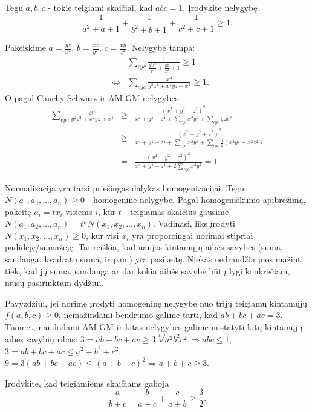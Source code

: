 \begin{pavnr}
  Tegu $a,b,c$ - tokie teigiami skaičiai, kad $abc=1$. Įrodykite nelygybę
  $$\frac{1}{a^2+a+1}+\frac{1}{b^2+b+1}+\frac{1}{c^2+c+1}\geq1.$$
\end{pavnr}

\begin{sprendimas}
  Pakeiskime $a=\frac{yz}{x^2}$, $b=\frac{xz}{y^2}$, $c=\frac{xy}{z^2}$. Nelygybė tampa:
  \begin{eqnarray*}&&\sum_{cyc}{\frac{1}{\frac{y^2z^2}{x^4}+\frac{yz}{x^2}+1}}\geq1\\
    &\Leftrightarrow&\sum_{cyc}{\frac{x^4}{y^2z^2+x^2yz+x^4}}\geq1.
  \end{eqnarray*}
  O pagal Cauchy-Schwarz ir AM-GM nelygybes:
  \begin{eqnarray*}\sum_{cyc}{\frac{x^4}{y^2z^2+x^2yz+x^4}}&\geq&\frac{(x^2+y^2+z^2)^2}{x^4+y^4+z^4+\sum\limits_{cyc}{x^2y^2}+\sum\limits_{cyc}{yzx^2}}\\
    &\geq&\frac{(x^2+y^2+z^2)^2}{x^4+y^4+z^4+\sum\limits_{cyc}{x^2y^2}+\sum\limits_{cyc}{\frac{1}{2}(x^2y^2+x^2z^2)}}\\
    &=&\frac{(x^2+y^2+z^2)^2}{x^4+y^4+z^4+2\sum\limits_{cyc}{x^2y^2}}=1.
  \end{eqnarray*}
\end{sprendimas}

Normalizacija yra tarsi priešingas dalykas homogenizacijai. Tegu
$N(a_1,a_2,...,a_n)\geq0$ - homogeninė nelygybė. Pagal homogeniškumo
apibrėžimą, pakeitę $a_i=tx_i$ visiems $i$, kur $t$ - teigiamas skaičius
gausime, $N(a_1,a_2,...,a_n)=t^n N(x_1,x_2,...,x_n)$. Vadinasi, liks
įrodyti $N(x_1,x_2,...,x_n)\geq0$, kur visi $x_i$ yra proporcingai norimai
stipriai padidėję/sumažėję. Tai reiškia, kad naujos kintamųjų aibės savybės
(suma, sandauga, kvadratų suma, ir pan.) yra pasikeitę. Niekas nedraudžia
juos mažinti tiek, kad jų suma, sandauga ar dar kokia aibės savybė būtų
lygi konkrečiam, mūsų pasirinktam dydžiui.

Pavyzdžiui, jei norime įrodyti homogeninę nelygybė nuo trijų
teigiamų kintamųjų $f(a,b,c)\geq0$, nemažindami bendrumo galime tarti, kad
$ab+bc+ac=3$. Tuomet, naudodami AM-GM ir kitas nelygybes galime nustatyti
kitų kintamųjų aibės savybių ribas:
$3=ab+bc+ac\geq3\sqrt[3]{a^2b^2c^2}\Rightarrow abc\leq1$, $3=ab+bc+ac\leq
a^2+b^2+c^2$, $9=3(ab+bc+ac)\leq(a+b+c)^2\Rightarrow a+b+c\geq3$.

\begin{pavnr}
  Įrodykite, kad teigiamiems skaičiams galioja $$\frac{a}{b+c}+\frac{b}{a+c}+\frac{c}{a+b}\geq\frac{3}{2}.$$
\end{pavnr}


